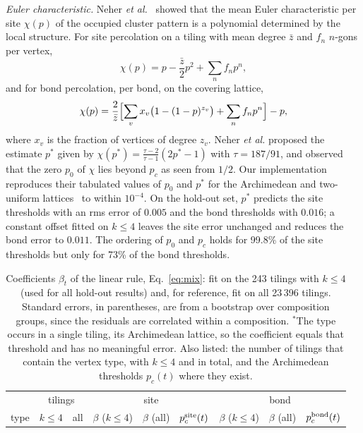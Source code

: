 \documentclass[pre,twocolumn,superscriptaddress,longbibliography,floatfix]{revtex4-2}
\newcommand{\pc}{p_c}
\newcommand{\ps}{p_c^{\rm site}}
\newcommand{\pb}{p_c^{\rm bond}}
\newcommand{\zb}{\bar z}
\begin{document}
\textit{Euler characteristic.} Neher \textit{et al.}~\cite{Neher08} showed that the mean Euler characteristic per site $\chi(p)$ of the occupied cluster pattern is a polynomial determined by the local structure. For site percolation on a tiling with mean degree $\zb$ and $f_n$ $n$-gons per vertex,
\begin{equation}
\chi(p)=p-\frac{\zb}{2}p^2+\sum_n f_np^n,
\end{equation}
and for bond percolation, per bond, on the covering lattice,
\begin{equation}
\chi(p)=\frac{2}{\zb}\Bigl[\sum_v x_v\bigl(1-(1-p)^{z_v}\bigr)+\sum_nf_np^n\Bigr]-p,
\end{equation}
where $x_v$ is the fraction of vertices of degree $z_v$. Neher \textit{et al.} proposed the estimate $p^\ast$ given by $\chi(p^\ast)=\frac{\tau-2}{\tau-1}(2p^\ast-1)$ with $\tau=187/91$, and observed that the zero $p_0$ of $\chi$ lies beyond $\pc$ as seen from $1/2$. Our implementation reproduces their tabulated values of $p_0$ and $p^\ast$ for the Archimedean and two-uniform lattices~\cite{Neher08supp} to within $10^{-4}$. On the hold-out set, $p^\ast$ predicts the site thresholds with an rms error of $0.005$ and the bond thresholds with $0.016$; a constant offset fitted on $k\le4$ leaves the site error unchanged and reduces the bond error to $0.011$. The ordering of $p_0$ and $\pc$ holds for 99.8\% of the site thresholds but only for 73\% of the bond thresholds.

\begin{table}
\caption{Coefficients $\beta_t$ of the linear rule, Eq.~\eqref{eq:mix}: fit on the 243 tilings with $k\le4$ (used for all hold-out results) and, for reference, fit on all 23\,396 tilings. Standard errors, in parentheses, are from a bootstrap over composition groups, since the residuals are correlated within a composition. $^\ast$The type occurs in a single tiling, its Archimedean lattice, so the coefficient equals that threshold and has no meaningful error. Also listed: the number of tilings that contain the vertex type, with $k\le4$ and in total, and the Archimedean thresholds $\pc(t)$ where they exist.}
\label{tab:beta}
\begin{ruledtabular}
\begin{tabular}{lrrllllll}
 & \multicolumn{2}{c}{tilings} & \multicolumn{3}{c}{site} & \multicolumn{3}{c}{bond}\\
type & $k\le4$ & all & $\beta$ ($k\le4$) & $\beta$ (all) & $\ps(t)$ & $\beta$ ($k\le4$) & $\beta$ (all) & $\pb(t)$\\
\hline

\end{tabular}
\end{ruledtabular}
\end{table}
\end{document}
